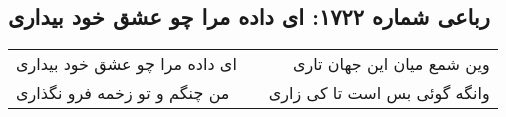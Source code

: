 \begin{center}
\section*{رباعی شماره ۱۷۲۲: ای داده مرا چو عشق خود بیداری}
\label{sec:1722}
\begin{longtable}{l p{0.5cm} r}
ای داده مرا چو عشق خود بیداری
&&
وین شمع میان این جهان تاری
\\
من چنگم و تو زخمه فرو نگذاری
&&
وانگه گوئی بس است تا کی زاری
\\
\end{longtable}
\end{center}
